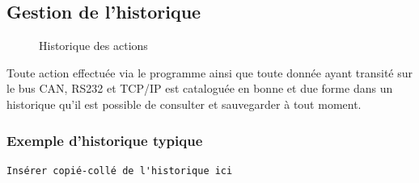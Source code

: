 \documentclass[10pt,a4paper,final]{article}
\begin{document}
\begin{spacing}{1.5}
\subsection{Gestion de l'historique}
\begin{figure}[hbtp]
\caption{Historique des actions}
\centering
{}
\end{figure}
Toute action effectuée via le programme ainsi que toute donnée ayant transité sur le bus CAN, RS232 et TCP/IP est cataloguée en bonne et due forme dans un historique qu'il est possible de consulter et sauvegarder à tout moment.

\subsubsection{Exemple d'historique typique}
\end{spacing}
\begin{verbatim}
Insérer copié-collé de l'historique ici
\end{verbatim}
\end{document}
